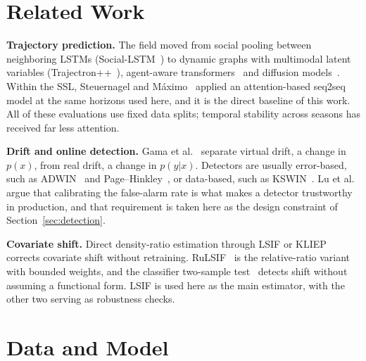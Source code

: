 \documentclass[conference]{IEEEtran}
\newif\ifmarkchanges
\newcommand{\chg}[1]{\ifmarkchanges\hl{#1}\else#1\fi}
\newcommand{\ins}[1]{\ifmarkchanges\hl{\footnotesize[+ #1]}\fi}
\begin{document}
\ins{paragrafo de outline do artigo}

\section{Related Work}
\label{sec:related}

\textbf{Trajectory prediction.}
\chg{The field moved from social pooling between neighboring LSTMs
(Social-LSTM\mbox{~\cite{alahi2016}}) to dynamic graphs with multimodal latent
variables (Trajectron++\mbox{~\cite{salzmann2020}}), agent-aware
transformers\mbox{~\cite{yuan2021}} and diffusion models\mbox{~\cite{gu2022}}.
Within the SSL, Steuernagel and M\'aximo\mbox{~\cite{seq2seq}} applied an
attention-based seq2seq model at the same horizons used here, and it is the
direct baseline of this work. All of these evaluations use fixed data splits;
temporal stability across seasons has received far less attention.}

\textbf{\chg{Drift and online detection.}}
Gama et al.~\cite{gama2014} separate virtual drift, a change in $p(x)$, from
real drift, a change in $p(y|x)$. \ins{por que a distincao importa na pratica}
\chg{Detectors are usually error-based, such as
ADWIN\mbox{~\cite{adwin}} and Page--Hinkley\mbox{~\cite{page_hinkley}}, or
data-based, such as KSWIN\mbox{~\cite{kswin}}.} Lu et al.~\cite{lu2019} argue
that calibrating the
false-alarm rate is what makes a detector trustworthy in production, and that
requirement is taken here as the design constraint of
Section~\ref{sec:detection}. \ins{EWC e o trade-off estabilidade--plasticidade}

\textbf{Covariate shift.}
\chg{Direct density-ratio estimation through LSIF or
KLIEP\mbox{~\cite{kliep,kanamori2009,sugiyama_book}} corrects covariate shift
without retraining. RuLSIF\mbox{~\cite{yamada2013}} is the relative-ratio
variant with bounded weights, and the classifier two-sample
test\mbox{~\cite{lopezpaz2017}} detects shift without assuming a functional
form.} LSIF is used here as the main estimator,
with the other two serving as robustness checks.

\section{Data and Model}
\label{sec:method}
\end{document}
